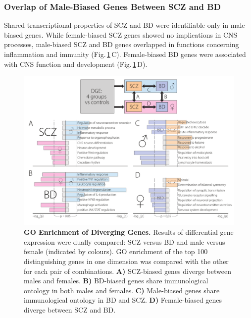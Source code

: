 \subsubsection{Overlap of Male-Biased Genes Between SCZ and BD}
Shared transcriptional properties of SCZ and BD were identifiable only in male-biased genes. While female-biased SCZ genes showed no implications in CNS processes, male-biased SCZ and BD genes overlapped in functions concerning inflammation and immunity (Fig.\,\ref{fig:scz-bd-go}\,C). Female-biased BD genes were associated with CNS function and development (Fig.\,\ref{fig:scz-bd-go}\,D).

\begin{figure}[hb]
\includegraphics[width=\textwidth]{figures/scz-bd-go}
\caption[GO Enrichment of Diverging Genes.]{\textbf{GO Enrichment of Diverging Genes.} Results of differential gene expression were dually compared: SCZ versus BD and male versus female (indicated by colours). GO enrichment of the top 100 distinguishing genes in one dimension was compared with the other for each pair of combinations. \textbf{A)} SCZ-biased genes diverge between males and females. \textbf{B)} BD-biased genes share immunological ontology in both males and females. \textbf{C)} Male-biased genes share immunological ontology in BD and SCZ. \textbf{D)} Female-biased genes diverge between SCZ and BD.
\label{fig:scz-bd-go}}
\end{figure}

